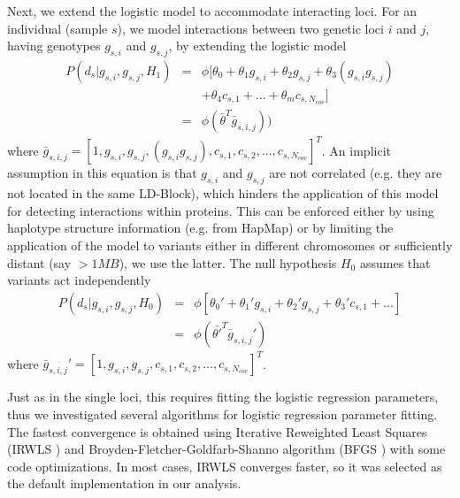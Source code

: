 Next, we extend the logistic model to accommodate interacting loci. For an individual (sample $s$), we model interactions between two genetic loci $i$ and $j$, having genotypes $g_{s,i}$ and $g_{s,j}$, by extending the logistic model
\begin{eqnarray} \label{eq:gwasLogRegH1}
    P( d_s | g_{s,i},g_{s,j}, H_1) & = & \phi[ \theta_0 + \theta_1 g_{s,i} + \theta_2 g_{s,j} + \theta_3 (g_{s,i} g_{s,j}) \\
    & & + \theta_4 c_{s,1} + ... + \theta_m c_{s,N_{cov}} ] \nonumber \\
    & = & \phi( \bar{\theta}^T \bar{g}_{s,i,j}) )
\end{eqnarray}
\noindent where $\bar{g}_{s,i,j} =  [1, g_{s,i}, g_{s,j}, ( g_{s,i} g_{s,j}), c_{s,1}, c_{s,2}, ..., c_{s,N_{cov}} ]^T$. 
An implicit assumption in this equation is that $g_{s,i}$ and $g_{s,j}$ are not correlated (e.g. they are not located in the same LD-Block), which hinders the application of this model for detecting interactions within proteins.
This can be enforced either by using haplotype structure information (e.g. from HapMap) or by limiting the application of the model to variants either in different chromosomes or sufficiently distant (say $> 1MB$), we use the latter.
The null hypothesis $H_0$ assumes that variants act independently
\begin{eqnarray} \label{eq:gwasLogRegH0}
    P( d_s | g_{s,i},g_{s,j}, H_0) & = & \phi[ \theta_0' + \theta_1' g_{s,i} + \theta_2' g_{s,j} + \theta_3' c_{s,1} + ... ] \\
   & = & \phi( \bar{\theta'}^T \bar{g}_{s,i,j}' )
\end{eqnarray}
\noindent where $\bar{g}_{s,i,j}' =  [1, g_{s,i}, g_{s,j}, c_{s,1} , c_{s,2}, ..., c_{s,N_{cov}} ]^T$.

Just as in the single loci, this requires fitting the logistic regression parameters, thus we investigated several algorithms for logistic regression parameter fitting. 
The fastest convergence is obtained using Iterative Reweighted Least Squares (IRWLS \cite{daubechies2010iteratively}) and Broyden-Fletcher-Goldfarb-Shanno algorithm (BFGS \cite{broyden1970convergence}) with some code optimizations. In most cases, IRWLS converges faster, so it was selected as the default implementation in our analysis.

